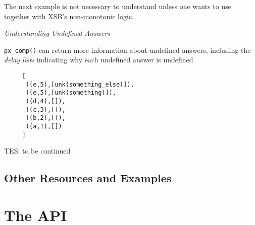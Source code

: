 The next example is not necessary to understand unless one wants to
use \px{} together with XSB's non-monotonic logic.  

\begin{example} \rm {\it Understanding Undefined Answers} \label{ex:px-comp-undef}

{\tt px\_comp()} can return more information about undefined answers,
including the {\em delay lists} indicating why each undefined answer
is undefined.

\begin{verbatim}
     [
      ((e,5),[unk(something_else)]),
      ((e,5),[unk(something)]),
      ((d,4),[]),
      ((c,3),[]),
      ((b,2),[]),
      ((a,1),[]) 
     ]
\end{verbatim}

{\sc TES: to be continued}

  \end{example}

\subsection{Other \px{} Resources and Examples}


\section{The \px{} API}

